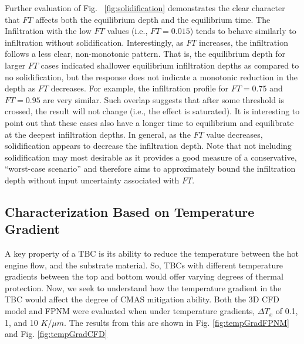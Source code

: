\documentclass[%
 aip,
 amsmath,amssymb,
 reprint,%
floatfix]{revtex4-1}
\begin{document}
Further evaluation of Fig. ~\ref{fig:solidification} demonstrates the clear character that $FT$ affects both the equilibrium depth and the equilibrium time. 
The Infiltration with the low $FT$ values (i.e., $FT=0.015$) tends to behave similarly to infiltration without solidification. 
Interestingly, as $FT$ increases, the infiltration follows a less clear, non-monotonic pattern. 
That is, the equilibrium depth for larger $FT$ cases indicated 
shallower equilibrium infiltration depths as compared to no solidification, but the response does not indicate a monotonic reduction in the depth as $FT$ decreases. 
For example, the infiltration profile for $FT=0.75$ and $FT=0.95$ are very similar.
Such overlap suggests that after some threshold is crossed, the result will not change (i.e., the effect is saturated). 
It is interesting to point out that these cases also have a longer time to equilibrium and equilibrate at the deepest infiltration depths. 
In general, as the $FT$ value decreases, solidification appears to decrease the infiltration depth. 
Note that not including solidification may most desirable as it provides a good measure of a conservative, ``worst-case scenario'' and therefore aims to approximately bound the infiltration depth without input uncertainty associated with $FT$.

 \subsection{Characterization Based on Temperature Gradient}

A key property of a TBC is its ability to reduce the temperature between the hot engine flow, and the substrate material. So, TBCs with different temperature gradients between the top and bottom would offer varying degrees of thermal protection. Now, we seek to understand how the temperature gradient in the TBC would affect the degree of CMAS mitigation ability. Both the 3D CFD model and FPNM were evaluated when under temperature gradients, $\Delta T_{x}$ of 0.1, 1, and 10 $K/\mu m$. The results from this are shown in Fig. \ref{fig:tempGradFPNM} and Fig. \ref{fig:tempGradCFD}
\end{document}
